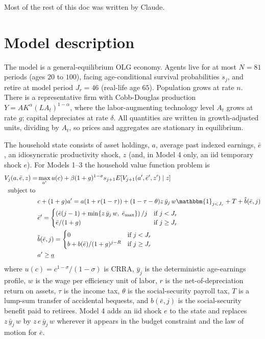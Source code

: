 \documentclass[11pt,fleqn]{article}
\begin{document}
Most of the rest of this doc was written by Claude.

\section{Model description}\label{sec:model}

The model is a general-equilibrium OLG economy. Agents live for at most $N=81$ periods (ages $20$ to $100$), facing age-conditional survival probabilities $s_j$, and retire at model period $J_r=46$ (real-life age $65$). Population grows at rate $n$. There is a representative firm with Cobb-Douglas production $Y=A K^\alpha (L A_t)^{1-\alpha}$, where the labor-augmenting technology level $A_t$ grows at rate $g$; capital depreciates at rate $\delta$. All quantities are written in growth-adjusted units, dividing by $A_t$, so prices and aggregates are stationary in equilibrium.

The household state consists of asset holdings, $a$, average past indexed earnings, $\bar{e}$, an idiosyncratic productivity shock, $z$ (and, in Model 4 only, an iid temporary shock $e$). For Models 1--3 the household value function problem is
\begin{align*}
 V_j(a,\bar{e},z) = & \max_{a'} u(c) + \beta (1+g)^{1-\sigma} s_{j+1} E\!\left[V_{j+1}(a',\bar{e}',z') \mid z\right] \\
 \text{subject to } & \\
 & c + (1+g) a' = a(1+r(1-\tau)) + (1-\tau-\theta) z\, \bar{y}_j\, w \mathbbm{1}_{j<J_r} + T + \hat{b}(\bar{e},j) \\
 & \bar{e}' =
   \begin{cases}
     \left(\bar{e}(j-1) + \min\{ z\, \bar{y}_j\, w,\; \bar{e}_{\max}\} \right) / j & \text{if } j<J_r \\
     \bar{e}/(1+g) & \text{if } j \ge J_r
   \end{cases} \\
 & \hat{b}(\bar{e},j) =
   \begin{cases}
     0 & \text{if } j<J_r \\
     b + b(\bar{e}) / (1+g)^{j-R} & \text{if } j \ge J_r
   \end{cases} \\
 & a' \ge \underline{a}
\end{align*}
where $u(c)=c^{1-\sigma}/(1-\sigma)$ is CRRA, $\bar{y}_j$ is the deterministic age-earnings profile, $w$ is the wage per efficiency unit of labor, $r$ is the net-of-depreciation return on assets, $\tau$ is the income tax, $\theta$ is the social-security payroll tax, $T$ is a lump-sum transfer of accidental bequests, and $\hat{b}(\bar{e},j)$ is the social-security benefit paid to retirees. Model 4 adds an iid shock $e$ to the state and replaces $z\, \bar{y}_j\, w$ by $z\, e\, \bar{y}_j\, w$ wherever it appears in the budget constraint and the law of motion for $\bar{e}$.
\end{document}
